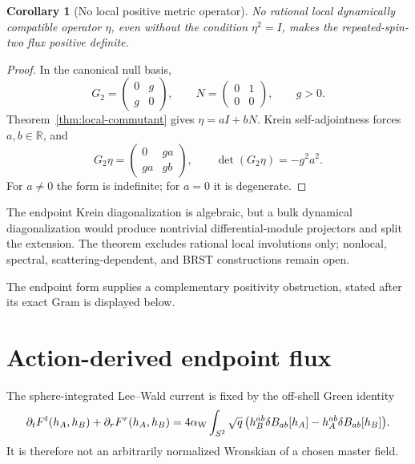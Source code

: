 \documentclass[11pt]{article}
\newtheorem{corollary}[theorem]{Corollary}
\theoremstyle{definition}
\theoremstyle{remark}
\begin{document}
\begin{corollary}[No local positive metric operator]
\label{cor:no-local-eta}
No rational local dynamically compatible operator \(\eta\), even without
the condition \(\eta^2=I\), makes the repeated-spin-two flux positive
definite.
\end{corollary}

\begin{proof}
In the canonical null basis,
\[
G_2=\begin{pmatrix}0&g\\g&0\end{pmatrix},
\qquad
N=\begin{pmatrix}0&1\\0&0\end{pmatrix},
\qquad g>0.
\]
Theorem~\ref{thm:local-commutant} gives
\(\eta=aI+bN\).  Krein self-adjointness forces \(a,b\in\mathbb R\), and
\[
G_2\eta
=
\begin{pmatrix}0&ga\\ga&gb\end{pmatrix},
\qquad
\det(G_2\eta)=-g^2a^2.
\]
For \(a\ne0\) the form is indefinite; for \(a=0\) it is degenerate.
\end{proof}

The endpoint Krein diagonalization is algebraic, but a bulk dynamical
diagonalization would produce nontrivial differential-module projectors and
split the extension.  The theorem excludes rational local involutions only;
nonlocal, spectral, scattering-dependent, and BRST constructions remain
open.

The endpoint form supplies a complementary positivity obstruction, stated
after its exact Gram is displayed below.

\section{Action-derived endpoint flux}

The sphere-integrated Lee--Wald current is fixed by the off-shell Green
identity
\begin{equation}
\label{eq:green}
\partial_tF^t(h_A,h_B)+\partial_rF^r(h_A,h_B)
=4\alpha_{\rm W}\int_{S^2}\sqrt q\,
\bigl(
h_B^{ab}\delta B_{ab}[h_A]
-h_A^{ab}\delta B_{ab}[h_B]
\bigr).
\end{equation}
It is therefore not an arbitrarily normalized Wronskian of a chosen master
field.
\end{document}
